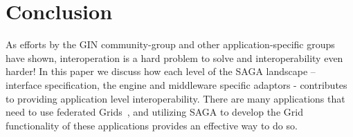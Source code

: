 \documentclass[conference,final]{IEEEtran}
\begin{document}






\section{Conclusion} %



As efforts by the GIN community-group and other application-specific
groups have shown, interoperation is a hard problem to solve and
interoperability even harder! In this paper we discuss how each level
of the SAGA landscape -- interface specification, the engine and
middleware specific adaptors - contributes to providing application
level interoperability.  There are many applications that need to use
federated Grids~\cite{clade06, gin_paper}, and utilizing SAGA to
develop the Grid functionality of these applications provides an
effective way to do so.
\end{document}
